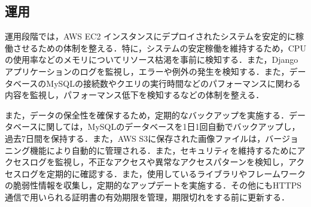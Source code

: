 \subsection{運用}
運用段階では，AWS EC2 インスタンスにデプロイされたシステムを安定的に稼働させるための体制を整える．特に，システムの安定稼働を維持するため，CPUの使用率などのメモリについてリソース枯渇を事前に検知する．また，Djangoアプリケーションのログを監視し，エラーや例外の発生を検知する．また，データベースのMySQLの接続数やクエリの実行時間などのパフォーマンスに関わる内容を監視し，パフォーマンス低下を検知するなどの体制を整える．

また，データの保全性を確保するため，定期的なバックアップを実施する．データベースに関しては，MySQLのデータベースを1日1回自動でバックアップし，過去7日間を保持する．また，AWS S3に保存された画像ファイルは，バージョニング機能により自動的に管理される．また，セキュリティを維持するためにアクセスログを監視し，不正なアクセスや異常なアクセスパターンを検知し，アクセスログを定期的に確認する．また，使用しているライブラリやフレームワークの脆弱性情報を収集し，定期的なアップデートを実施する．その他にもHTTPS通信で用いられる証明書の有効期限を管理，期限切れをする前に更新する．
